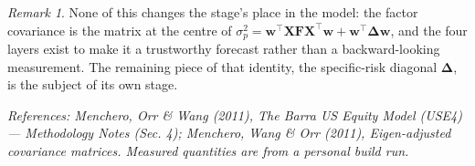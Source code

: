 \documentclass[11pt]{article}
\theoremstyle{definition}
\theoremstyle{plain}
\theoremstyle{remark}
\newtheorem*{remark}{Remark}
\newcommand{\T}{^{\!\top}}
\newcommand{\wvec}{\mathbf{w}}
\newcommand{\Xmat}{\mathbf{X}}
\newcommand{\Fmat}{\mathbf{F}}
\newcommand{\Del}{\boldsymbol{\Delta}}
\begin{document}
\begin{remark}
None of this changes the stage's place in the model: the factor covariance is the matrix at the centre of $\sigma_p^2=\wvec\T\Xmat\Fmat\Xmat\T\wvec+\wvec\T\Del\wvec$, and the four layers exist to make it a trustworthy forecast rather than a backward-looking measurement. The remaining piece of that identity, the specific-risk diagonal $\Del$, is the subject of its own stage.
\end{remark}

\begin{center}\small\itshape
References: Menchero, Orr \& Wang (2011), \textit{The Barra US Equity Model (USE4)} --- Methodology Notes (Sec. 4); Menchero, Wang \& Orr (2011), \textit{Eigen-adjusted covariance matrices}. Measured quantities are from a personal build run.
\end{center}
\end{document}
